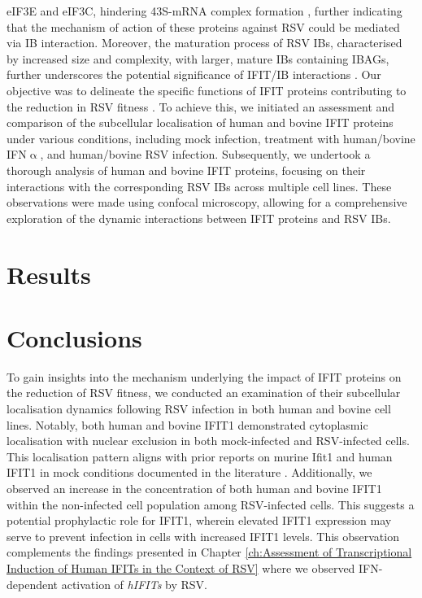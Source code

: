 eIF3E and eIF3C, hindering 43S-mRNA complex formation \cite{Diamond2014IFIT1:Translation, Guo2000CharacterizationVirus}, further indicating that the mechanism of action of these proteins against RSV could be mediated via IB interaction. Moreover, the maturation process of RSV IBs, characterised by increased size and complexity, with larger, mature IBs containing IBAGs, further underscores the potential significance of IFIT/IB interactions \cite{Rincheval2017FunctionalVirus, Jobe2021BovineResponses}. Our objective was to delineate the specific functions of IFIT proteins contributing to the reduction in RSV fitness \cite{Drori2020InfluenzaProteins}. To achieve this, we initiated an assessment and comparison of the subcellular localisation of human and bovine IFIT proteins under various conditions, including mock infection, treatment with human/bovine IFN$\upalpha$, and human/bovine RSV infection. Subsequently, we undertook a thorough analysis of human and bovine IFIT proteins, focusing on their interactions with the corresponding RSV IBs across multiple cell lines. These observations were made using confocal microscopy, allowing for a comprehensive exploration of the dynamic interactions between IFIT proteins and RSV IBs.

\section{Results} \label{sec:Results-Chapter3}



\section{Conclusions} \label{sec:Conclusions-Chapter3}
To gain insights into the mechanism underlying the impact of IFIT proteins on the reduction of RSV fitness, we conducted an examination of their subcellular localisation dynamics following RSV infection in both human and bovine cell lines. Notably, both human and bovine IFIT1 demonstrated cytoplasmic localisation with nuclear exclusion in both mock-infected and RSV-infected cells. This localisation pattern aligns with prior reports on murine Ifit1 and human IFIT1 in mock conditions documented in the literature \cite{Pichlmair2011IFIT1RNA, Terenzi2008Interferon-inducibleE1, Thul2017AProteome}. Additionally, we observed an increase in the concentration of both human and bovine IFIT1 within the non-infected cell population among RSV-infected cells. This suggests a potential prophylactic role for IFIT1, wherein elevated IFIT1 expression may serve to prevent infection in cells with increased IFIT1 levels. This observation complements the findings presented in Chapter \ref{ch:Assessment of Transcriptional Induction of Human IFITs in the Context of RSV} where we observed IFN-dependent activation of \textit{hIFITs} by RSV.

